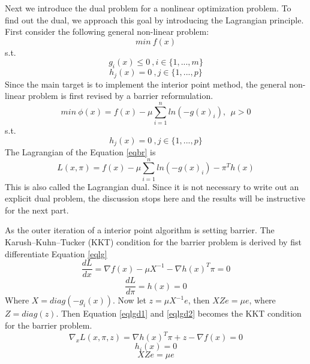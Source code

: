 Next we introduce the dual problem for a nonlinear optimization problem. To find out the dual, we approach this goal by introducing the Lagrangian principle. First consider the following general non-linear problem:
\begin{equation}\label{eqgp}
min\ f(x)
\end{equation}
s.t.
$$
g_i(x)\leq 0 \ ,i\in\{1,...,m\}
$$
$$
h_j(x)=0 \ ,j\in\{1,...,p\}
$$
Since the main target is to implement the interior point method, the general non-linear problem is first revised by a barrier reformulation.
\begin{equation}\label{eqbr}
min\ \phi(x)=f(x)-\mu \sum\limits_{i=1}^n ln(-g(x)_i) ,\ \ \mu>0
\end{equation}
s.t.
$$
h_j(x)=0 \ ,j\in\{1,...,p\}
$$
The Lagrangian of the Equation \eqref{eqbr} is
\begin{equation}\label{eqlg}
L(x,\pi)=f(x)-\mu \sum\limits_{i=1}^n ln(-g(x)_i)-\pi^T h(x)
\end{equation}
This is also called the Lagrangian dual. Since it is not necessary to write out an explicit dual problem, the discussion stops here and the results will be instructive for the next part.

As the outer iteration of a interior point algorithm is setting barrier. The Karush–Kuhn–Tucker (KKT) condition for the barrier problem is derived by fist differentiate Equation \eqref{eqlg}
\begin{equation}\label{eqlgd1}
\dfrac{dL}{dx}=\nabla f(x)-\mu X^{-1}-{\nabla h(x)}^T \pi=0
\end{equation}
\begin{equation}\label{eqlgd2}
\dfrac{dL}{d\pi}=h(x)=0
\end{equation}
Where $X=diag(-g_i(x))$. Now let $z=\mu X^{-1} e$, then $XZe=\mu e$, where $Z=diag(z)$. Then Equation \eqref{eqlgd1} and \eqref{eqlgd2} becomes the KKT condition for the barrier problem.
\begin{equation}\label{eqcon1}
\nabla_x L(x,\pi,z)=\nabla {h(x)}^T \pi+z-\nabla f(x)=0
\end{equation}
\begin{equation}\label{eqcon2}
h_i(x)=0
\end{equation}
\begin{equation}\label{eqcon3}
XZe=\mu e
\end{equation}

